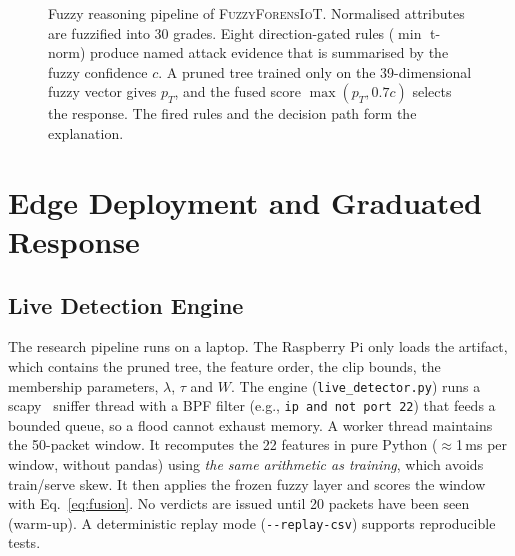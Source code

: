 \documentclass[conference]{IEEEtran}
\newcommand{\fname}{\textsc{FuzzyForensIoT}}
\begin{document}
\begin{figure}[t]
{}
\caption{Fuzzy reasoning pipeline of \fname{}. Normalised attributes are fuzzified into 30 grades. Eight direction-gated rules ($\min$ t-norm) produce named attack evidence that is summarised by the fuzzy confidence $c$. A pruned tree trained only on the 39-dimensional fuzzy vector gives $p_T$, and the fused score $\max(p_T,0.7c)$ selects the response. The fired rules and the decision path form the explanation.}
\label{fig:fuzzypipe}
\end{figure}

\section{Edge Deployment and Graduated Response}
\label{sec:edge}

\subsection{Live Detection Engine}
The research pipeline runs on a laptop. The Raspberry Pi only loads the artifact, which contains the pruned tree, the feature order, the clip bounds, the membership parameters, $\lambda$, $\tau$ and $W$. The engine (\texttt{live\_detector.py}) runs a scapy~\cite{scapy} sniffer thread with a BPF filter (e.g., \texttt{ip and not port 22}) that feeds a bounded queue, so a flood cannot exhaust memory. A worker thread maintains the 50-packet window. It recomputes the 22 features in pure Python ($\approx$1\,ms per window, without pandas) using \emph{the same arithmetic as training}, which avoids train/serve skew. It then applies the frozen fuzzy layer and scores the window with Eq.~\eqref{eq:fusion}. No verdicts are issued until 20 packets have been seen (warm-up). A deterministic replay mode (\texttt{-{}-replay-csv}) supports reproducible tests.
\end{document}
